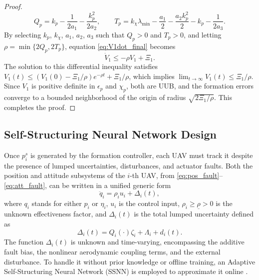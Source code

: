 \begin{proof}
\begin{equation}
    Q_p = k_p - \frac{1}{2a_1} - \frac{k_p^2}{2a_2}, \qquad
    T_p = k_\chi \lambda_{\min} - \frac{a_1}{2} - \frac{a_2 k_p^2}{2}
    - k_p - \frac{1}{2a_3}.
\end{equation}
By selecting $k_p$, $k_\chi$, $a_1$, $a_2$, $a_3$ such that $Q_p > 0$ and
$T_p > 0$, and letting $\rho = \min\{2Q_p, 2T_p\}$, equation
\eqref{eq:V1dot_final} becomes
\begin{equation}
    \dot{V}_1 \leq -\rho V_1 + \Xi_1.
    \label{eq:V1_uub}
\end{equation}
The solution to this differential inequality satisfies
$V_1(t) \leq (V_1(0) - \Xi_1/\rho)e^{-\rho t} + \Xi_1/\rho$,
which implies $\lim_{t \to \infty} V_1(t) \leq \Xi_1/\rho$. Since $V_1$ is
positive definite in $\epsilon_p$ and $\chi_p$, both are UUB, and the formation
errors converge to a bounded neighborhood of the origin of radius
$\sqrt{2\Xi_1/\rho}$. This completes the proof.
\end{proof}

\subsection{Self-Structuring Neural Network Design}
\label{sec5:ssnn}

Once $p_i^s$ is generated by the formation controller, each UAV must track it
despite the presence of lumped uncertainties, disturbances, and actuator faults.
Both the position and attitude subsystems of the $i$-th UAV, from
\eqref{eq:pos_fault}--\eqref{eq:att_fault}, can be written in a unified generic
form
\begin{equation}
    \ddot{q}_i = \rho_i u_i + \Delta_i(t),
    \label{eq:generic_subsystem}
\end{equation}
where $q_i$ stands for either $p_i$ or $\eta_i$, $u_i$ is the control input,
$\rho_i \geq \underline{\rho} > 0$ is the unknown effectiveness factor, and
$\Delta_i(t)$ is the total lumped uncertainty defined as
\begin{equation}
    \Delta_i(t) = Q_i(\cdot)\zeta_i + \Lambda_i + d_i(t).
    \label{eq:lumped}
\end{equation}
The function $\Delta_i(t)$ is unknown and time-varying, encompassing the
additive fault bias, the nonlinear aerodynamic coupling terms, and the external
disturbance. To handle it without prior knowledge or offline training, an
Adaptive Self-Structuring Neural Network (SSNN) is employed to approximate it
online \cite{SSNN1, SSNN_Ref2}.

